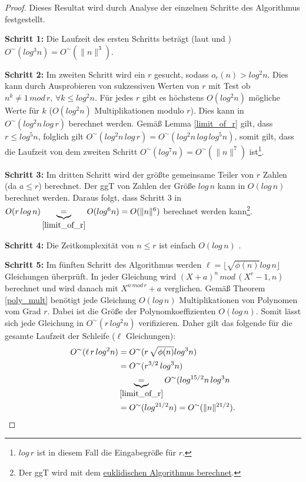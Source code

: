 \documentclass[12pt,oneside]{article}
\theoremstyle{remark}
\theoremstyle{definition}
\begin{document}
\begin{proof}
Dieses Resultat wird durch Analyse der einzelnen Schritte des Algorithmus festgestellt.

\textbf{Schritt 1:}\newline
Die Laufzeit des ersten Schritts beträgt (laut \cite{computer-algebra} und \cite{D73}) $O^{\sim}(log^3 n) = O^{\sim}(\lVert n \rVert^3)$.

\textbf{Schritt 2:}\newline
Im zweiten Schritt wird ein $r$ gesucht, sodass $o_{r}(n) > log^2 n$. Dies kann durch Ausprobieren von sukzessiven Werten von $r$ mit Test ob $n^k \neq 1 \,  mod \, r, \, \forall k \leq log^2 n$. Für jedes $r$ gibt es höchstens $O(log^2 n)$ mögliche Werte für $k$ ($O(log^2n)$ Multiplikationen modulo $r$). Dies kann in $O^{\sim}(log^2 n \, log \, r)$ berechnet werden.\newline\newline
Gemäß Lemma \ref{limit_of_r} gilt, dass $ r \leq log^5 n$, folglich gilt $O^{\sim}(log^2 n \, log \, r) = O^{\sim}(log^2 n \, log \, log^5 n)$, somit gilt, dass die Laufzeit von dem zweiten Schritt $O^{\sim}(log^7 n) = O^{\sim}(\lVert n \rVert^7)$ ist\footnote{$log \,r$ ist in diesem Fall die Eingabegröße für $r$.}. 


\textbf{Schritt 3:}\newline
Im dritten Schritt wird der größte gemeinsame Teiler von $r$ Zahlen (da $a \leq r$) berechnet. Der ggT von Zahlen der Größe $log \, n$ kann in $O(log \,n)$ berechnet werden\cite{D73}. Daraus folgt, dass Schritt 3 in $O(r \, log \, n) \underbrace{=}_{\ref{limit_of_r}} O(log^6 n) = O(\lVert n \rVert^6)$ berechnet werden kann\footnote{Der ggT wird mit dem \href{https://brilliant.org/wiki/euclidean-algorithm/}{euklidischen Algorithmus berechnet}.}. 

\textbf{Schritt 4:}\newline
Die Zeitkomplexität von $n \leq r$ ist einfach $O(log \, n)$ \cite{computer-algebra}.

\textbf{Schritt 5:}\newline
Im fünften Schritt des Algorithmus werden $\ell = \lfloor \sqrt{\phi(n)} log \, n \rfloor$ Gleichungen überprüft. In jeder Gleichung wird $(X + a)^n \, mod \, (X^r - 1,n)$ berechnet und wird danach mit $X^{n \, mod \, r} + a$ verglichen. Gemäß Theorem \ref{poly_mult} benötigt jede Gleichung $O(log \, n)$ Multiplikationen von Polynomen vom Grad $r$. Dabei ist die Größe der Polynomkoeffizienten $O(log \, n)$. Somit lässt sich jede Gleichung in $O^{\sim}(r \, log^2n)$ verifizieren. Daher gilt das folgende für die gesamte Laufzeit der Schleife ($\ell$ Gleichungen):\newline
\begin{align*}
    O^{\sim}(\ell \, r \, log^2n) &= O^{\sim}(r \, \sqrt{\phi(n)} log^3 n)  \\
    &= O^{\sim}(r^{3/2} \, log^3 n) \\
    &\underbrace{=}_{\ref{limit_of_r}} O^{\sim}(log^{15/2}n \, log^3n \\ 
    &=O^{\sim}(log^{21/2}n) = O^{\sim}( \lVert n \rVert^{21/2}).
\end{align*}


\end{proof}
\end{document}
